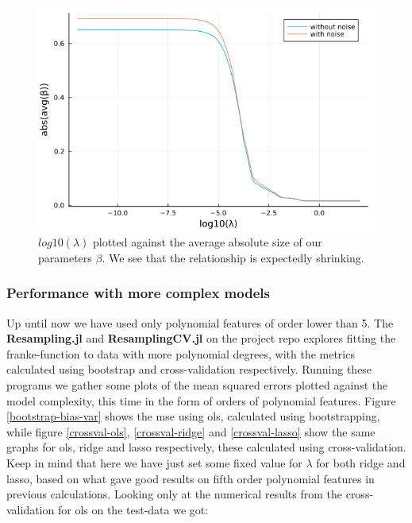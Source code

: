 \documentclass{article}
\begin{document}
\begin{figure}
    \centerline{\includegraphics[scale=0.5]{lasso_beta_size}}
    \caption{$log10(\lambda)$ plotted against the average absolute size of our parameters $\beta$. We see that the relationship is expectedly shrinking.}
    \label{Lasso-beta-sizes}
\end{figure}

\subsubsection{Performance with more complex models}
Up until now we have used only polynomial features of order lower than 5. The
\textbf{Resampling.jl} and \textbf{ResamplingCV.jl} on the project repo
\cite{githubrepoproject1} explores fitting the franke-function to data with more
polynomial degrees, with the metrics calculated using bootstrap and
cross-validation respectively. Running these programs we gather some plots of
the mean squared errors plotted against the model complexity, this time in the
form of orders of polynomial features. Figure \ref{bootstrap-bias-var} shows the
mse using ols, calculated using bootstrapping, while figure \ref{crossval-ols},
\ref{crossval-ridge} and \ref{crossval-lasso} show the same graphs for ols,
ridge and lasso respectively, these calculated using cross-validation. Keep in
mind that here we have just set some fixed value for $\lambda$ for both ridge
and lasso, based on what gave good results on fifth order polynomial features in
previous calculations. Looking only at the numerical results from the
cross-validation for ols on the test-data we got:

\begin{table}[htpb!]
\end{table}
\end{document}
